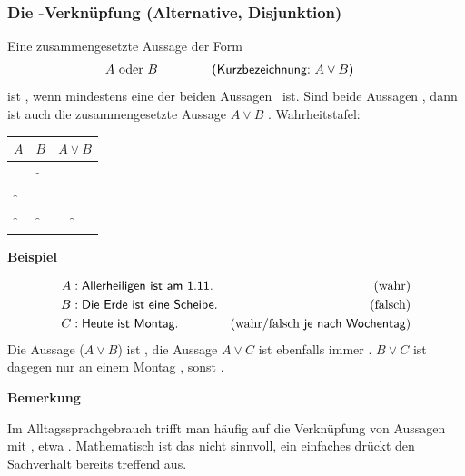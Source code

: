 \documentclass[a4paper,12pt,oneside,openany]{book}
\newenvironment{beispiel}[1][]{\vspace{2mm}\normalfont\normalsize \textbf{Beispiel}\ifthenelse{\equal{#1}{}}{:}{: #1}\newline\vspace{-8mm}\begin{addmargin}[5mm]{0cm}}{\end{addmargin}}
\newenvironment{bemerkung}[1][]{\vspace{2mm}\normalfont\normalsize \textbf{Bemerkung}\ifthenelse{\equal{#1}{}}{:}{: #1}\newline\vspace{-8mm}\begin{addmargin}[5mm]{0cm}}{\end{addmargin}}
\newcommand{\überschrift}[1]{\subsubsection{#1}}
\begin{document}
\überschrift{Die -Verknüpfung (Alternative, Disjunktion)}

Eine zusammengesetzte Aussage der Form
\begin{align*}
	A \textrm{~oder~} B & \hspace*{1.5cm}\textsf{(Kurzbezeichnung:~} A \lor B \textsf{)}
\end{align*}
ist \wahr, wenn mindestens  eine der beiden Aussagen \wahr~ist. Sind beide
Aussagen \falsch, dann ist auch die zusammengesetzte Aussage \( A \lor B\) \falsch. Wahrheitstafel:

\begin{table}[h]
	\centering
	\begin{tabular}{c | c | c}
		\( A \) & \( B \) & \( A \lor B \) \\
		\hline
		\w      & \w      & \w             \\
		\w      & \f      & \w             \\
		\f      & \w      & \w             \\
		\f      & \f      & \f
	\end{tabular}
\end{table}

\begin{beispiel}[\textquote{oder}]
	\vspace{-1.5cm}
	\begin{align*}
		A & : \textsf{Allerheiligen ist am 1.11.} & (\textrm{wahr})                                       \\
		B & : \textsf{Die Erde ist eine Scheibe.} & (\textrm{falsch})                                     \\
		C & : \textsf{Heute ist Montag.}          & (\textrm{wahr} / \textrm{falsch} \textsf{~je nach Wochentag})
	\end{align*}
	Die Aussage  (\( A \lor B \)) ist \wahr,
	die Aussage \( A \lor C \) ist ebenfalls immer \wahr. \( B \lor C \) ist dagegen nur an einem Montag \wahr, sonst \falsch.
\end{beispiel}

\begin{bemerkung}
	Im Alltagssprachgebrauch trifft man häufig auf die Verknüpfung von Aussagen mit
	, etwa .
	Mathematisch ist das nicht sinnvoll, ein einfaches  drückt den Sachverhalt
	bereits treffend aus.
\end{bemerkung}
\end{document}
